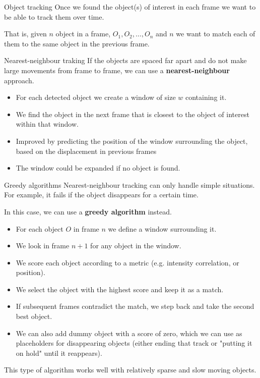 \documentclass[9pt, aspectratio=169]{beamer}
\begin{document}
\begin{frame}
    {Object tracking}
    Once we found the object(s) of interest in each frame we want to be able to track them over time.

    That is, given $n$ object in a frame, $O_1, O_2, \ldots, O_n$ and $n$ we want to match each of them to the same object in the previous frame.
\end{frame}

\begin{frame}
    {Nearest-neighbour traking}
    If the objects are spaced far apart and do not make large movements from frame to frame, we can use a \textbf{nearest-neighbour} approach.

    \pause

    \begin{itemize}
        \item For each detected object we create a window of size $w$ containing it.
        \item We find the object in the next frame that is closest to the object of interest within that window.
              \pause
        \item Improved by predicting the position of the window surrounding the object, based on the displacement in previous frames
        \item The window could be expanded if no object is found.
    \end{itemize}
\end{frame}

\begin{frame}
    {Greedy algorithms}
    Nearest-neighbour tracking can only handle simple situations. For example, it fails if the object disappears for a certain time.

    In this case, we can use a \textbf{greedy algorithm} instead.

    \begin{itemize}[<+->]
        \item For each object $O$ in frame $n$ we define a window surrounding it.
        \item We look in frame $n+1$ for any object in the window.
        \item We score each object according to a metric (e.g. intensity correlation, or position).
        \item We select the object with the highest score and keep it as a match.
        \item If subsequent frames contradict the match, we step back and take the second best object.
        \item We can also add dummy object with a score of zero, which we can use as placeholders for disappearing objects (either ending that track or "putting it on hold" until it reappears).
    \end{itemize}

    \pause
    This type of algorithm works well with relatively sparse and slow moving objects.
\end{frame}
\end{document}
